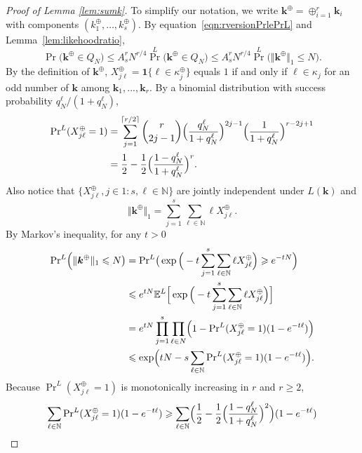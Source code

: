 \documentclass[10pt,a4paper]{amsart}
\newcommand{\bsk}{\boldsymbol{k}}
\newcommand{\bsone}{\boldsymbol{1}}
\newcommand{\e}{\mathbb{E}}
\renewcommand{\geq}{\geqslant}
\renewcommand{\leq}{\leqslant}
\newcommand{\natu}{\mathbb{N}}
\begin{document}
\begin{proof}[Proof of Lemma \ref{lem:sumk}]
To simplify our notation, we write $\bsk^\oplus=\oplus_{i=1}^r\bsk_i$ with components $(k^\oplus_1,\dots, k^\oplus_s)$. By equation~\eqref{eqn:rversionPrlePrL} and Lemma~\ref{lem:likehoodratio},
    \begin{equation}\label{eqn:PrlePrLforsumk}
        \Pr\big(\bsk^\oplus\in Q_N\big)\leq A^r_s N^{r/4}{\textstyle\Pr}^L\big(\bsk^\oplus\in Q_N\big)\leq A^r_s N^{r/4}{\textstyle\Pr}^L\big(\Vert\bsk^\oplus\Vert_1\leq N\big).
    \end{equation}
    By the definition of $\bsk^\oplus$, $X^\oplus_{j\ell}=\bsone\{\ell\in \kappa^\oplus_j\}$ equals $1$ if and only if $\ell\in \kappa_j$ for an odd number of $\bsk$ among $\bsk_1,...,\bsk_r$.
    By a binomial distribution with success probability $q_N^\ell/(1+q_N^\ell)$,
    \begin{align}\label{eqn:oddbinomial}
        {\textstyle\Pr}^L(X^\oplus_{j\ell}=1)&=\sum_{j=1}^{\lceil r/2\rceil}{r\choose 2j-1}\Big(\frac{q_N^\ell}{1+q_N^\ell}\Big)^{2j-1}\Big(\frac{1}{1+q_N^\ell}\Big)^{r-2j+1}\\
        &=\frac{1}{2}-\frac{1}{2}\Bigl(\frac{1-q_N^\ell}{1+q_N^\ell}\Bigr)^r. \nonumber
    \end{align}
    Also notice that $\{X^\oplus_{j\ell}, j\in1{:}s, \ell\in \natu\}$ are jointly independent under $L(\bsk)$ and $$\Vert\bsk^\oplus\Vert_1=\sum_{j=1}^s\sum_{\ell\in\natu}\ell X^\oplus_{j\ell}.$$
 By Markov's inequality, for any $t>0$
    \begin{align}\label{eqn:chernoffbound}
        {\textstyle\Pr}^L\Big(\Vert\bsk^\oplus\Vert_1\leq N\big)&={\textstyle\Pr}^L\big(\exp\Big(-t\sum_{j=1}^s\sum_{\ell\in\natu}\ell X^\oplus_{j\ell}\Big)\geq e^{-tN}\Big)\\
        & \leq e^{tN} \e^L\Big[\exp\Big(-t\sum_{j=1}^s\sum_{\ell\in\natu}\ell X^\oplus_{j\ell}\Big)\Big]\nonumber\\
        & =e^{tN}\prod_{j=1}^s\prod_{\ell\in N}\Bigl(1-{\textstyle\Pr}^L(X^\oplus_{j\ell}=1)(1-e^{-t\ell })\Bigr)\nonumber\\
        &\leq \exp\Bigl(tN-s\sum_{\ell\in\natu}{\textstyle\Pr}^L(X^\oplus_{j\ell}=1)(1-e^{-t\ell })\Bigr).\nonumber
    \end{align}
    Because ${\textstyle\Pr}^L(X^\oplus_{j\ell}=1)$ is monotonically increasing in $r$ and $r\geq 2$,
    \begin{align*}
        \sum_{\ell\in\natu}{\textstyle\Pr}^L(X^\oplus_{j\ell}=1)(1-e^{-t\ell })
        &\geq \sum_{\ell\in\natu}\Bigl(\frac{1}{2}-\frac{1}{2}\Bigl(\frac{1-q_N^\ell}{1+q_N^\ell}\Bigr)^2\Bigr)(1-e^{-t\ell })\\

\end{align*}
\end{proof}
\end{document}
